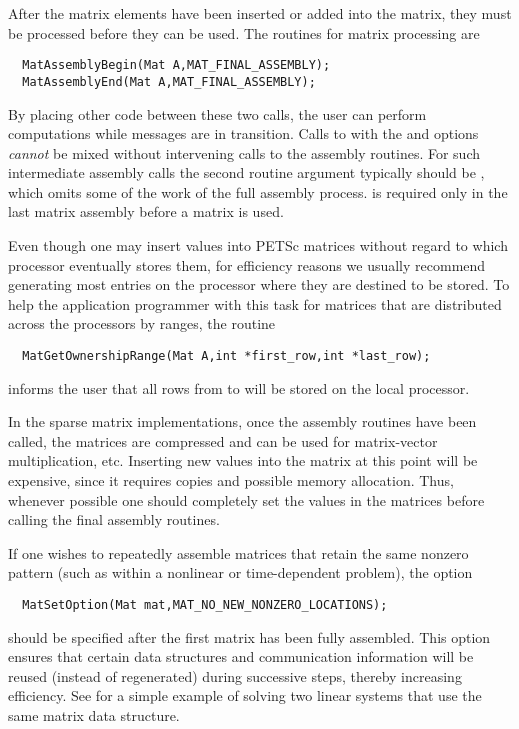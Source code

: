 After the matrix elements have been inserted or added into the matrix, 
they must be processed before they can be used. The routines for matrix
processing are  
\begin{verbatim}
  MatAssemblyBegin(Mat A,MAT_FINAL_ASSEMBLY);
  MatAssemblyEnd(Mat A,MAT_FINAL_ASSEMBLY);
\end{verbatim}
By placing other code between these two calls, the user can perform
computations while messages are in transition.
Calls to  with the  and  options {\em cannot} be mixed without intervening calls to
the assembly routines.  For such intermediate assembly calls the
second routine argument  typically should be ,
 which omits some of the work of the full 
assembly process.    is
required only in the last matrix assembly before a matrix is used.

Even though one may insert values into PETSc matrices without regard
to which processor eventually stores them, for efficiency
reasons we usually recommend generating most entries on the
processor where they are destined to be stored.  To help the
application programmer with this task for matrices that are
distributed across the processors by ranges, the routine
\begin{verbatim}
  MatGetOwnershipRange(Mat A,int *first_row,int *last_row);
\end{verbatim}
informs the user that all rows from  to 
 will be stored on the local processor.

In the sparse matrix implementations, once the assembly routines have been 
called, the matrices are compressed and can be used for matrix-vector
multiplication, etc.
Inserting new values into the matrix at this point will be expensive, 
since it requires copies and possible memory allocation. Thus, whenever 
possible one should completely set the values in the matrices before 
calling the final assembly routines. 

If one wishes to repeatedly assemble matrices that retain the same
nonzero pattern (such as within a nonlinear or time-dependent
problem), the option
\begin{verbatim}
  MatSetOption(Mat mat,MAT_NO_NEW_NONZERO_LOCATIONS);
\end{verbatim}
should be specified after the first matrix has been fully assembled.
This option ensures that certain data structures and communication
information will be reused (instead of regenerated) during successive
steps, thereby increasing efficiency.  
See  for a simple example of
solving two linear systems that use the same matrix data structure.

